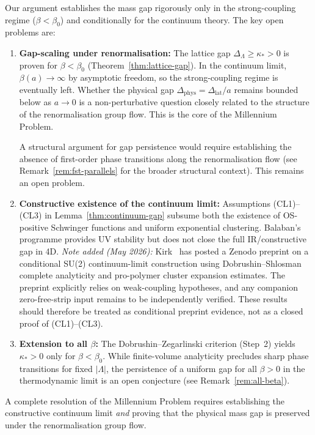\documentclass[12pt,a4paper]{article}
\theoremstyle{definition}
\theoremstyle{plain}
\theoremstyle{remark}
\begin{document}
Our argument establishes the mass gap rigorously only in the strong-coupling regime ($\beta < \beta_0$) and conditionally for the continuum theory. The key open problems are:
\begin{enumerate}
    \item \textbf{Gap-scaling under renormalisation:} The lattice gap $\Delta_\Lambda \geq \kappa_* > 0$ is proven for $\beta < \beta_0$ (Theorem~\ref{thm:lattice-gap}). In the continuum limit, $\beta(a) \to \infty$ by asymptotic freedom, so the strong-coupling regime is eventually left. Whether the physical gap $\Delta_{\mathrm{phys}} = \Delta_{\mathrm{lat}}/a$ remains bounded below as $a \to 0$ is a non-perturbative question closely related to the structure of the renormalisation group flow. This is the core of the Millennium Problem.

    A structural argument for gap persistence would require establishing the absence of first-order phase transitions along the renormalisation flow (see Remark~\ref{rem:fst-parallels} for the broader structural context). This remains an open problem.

    \item \textbf{Constructive existence of the continuum limit:} Assumptions (CL1)--(CL3) in Lemma~\ref{thm:continuum-gap} subsume both the existence of OS-positive Schwinger functions and uniform exponential clustering. Balaban's programme provides UV stability but does not close the full IR/constructive gap in 4D. \emph{Note added (May 2026):} Kirk~\cite{Kirk2026} has posted a Zenodo preprint on a conditional SU(2) continuum-limit construction using Dobrushin--Shlosman complete analyticity and pro-polymer cluster expansion estimates. The preprint explicitly relies on weak-coupling hypotheses, and any companion zero-free-strip input remains to be independently verified. These results should therefore be treated as conditional preprint evidence, not as a closed proof of (CL1)--(CL3).

    \item \textbf{Extension to all $\beta$:} The Dobrushin--Zegarlinski criterion (Step~2) yields $\kappa_* > 0$ only for $\beta < \beta_0$. While finite-volume analyticity precludes sharp phase transitions for fixed $|\Lambda|$, the persistence of a uniform gap for all $\beta > 0$ in the thermodynamic limit is an open conjecture (see Remark~\ref{rem:all-beta}).
\end{enumerate}

A complete resolution of the Millennium Problem requires establishing the constructive continuum limit \emph{and} proving that the physical mass gap is preserved under the renormalisation group flow.
\end{document}
